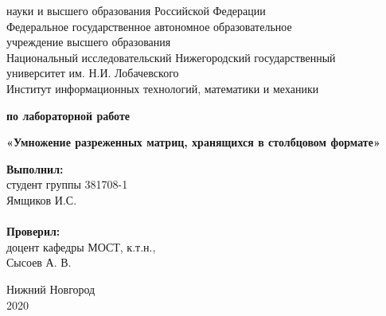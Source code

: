 \documentclass{report}
\begin{document}
	
\begin{titlepage}
	
	\begin{center}
		 науки и высшего образования Российской Федерации\\[\baselineskip]
		Федеральное государственное автономное образовательное\\
		учреждение высшего образования \\
		Национальный исследовательский Нижегородский государственный\\
		университет им. Н.И. Лобачевского\\[\baselineskip]
		Институт информационных технологий, математики и механики \\
	\end{center}
	
	\vspace{4em}
	
	\begin{center}
		\textbf{ по лабораторной работе} \\
	\end{center}

	\begin{center}
		\textbf{\LARGE«Умножение разреженных матриц, хранящихся в столбцовом формате»} \\
	\end{center}
	
	\vspace{10em}
	
	\hfill\parbox{6cm}{
		\hspace*{5cm}\hspace*{-5cm}\textbf{Выполнил:} \\ студент группы 381708-1 \\ Ямщиков И.С. \\
		\\
		\hspace*{5cm}\hspace*{-5cm}\textbf{Проверил:}\\ доцент кафедры МОСТ, к.т.н., \\ Сысоев А. В.
	}
	
	\vspace{\fill}
	
	\begin{center} 
		Нижний Новгород \\ 2020 
	\end{center}
	
\end{titlepage}
\end{document}
